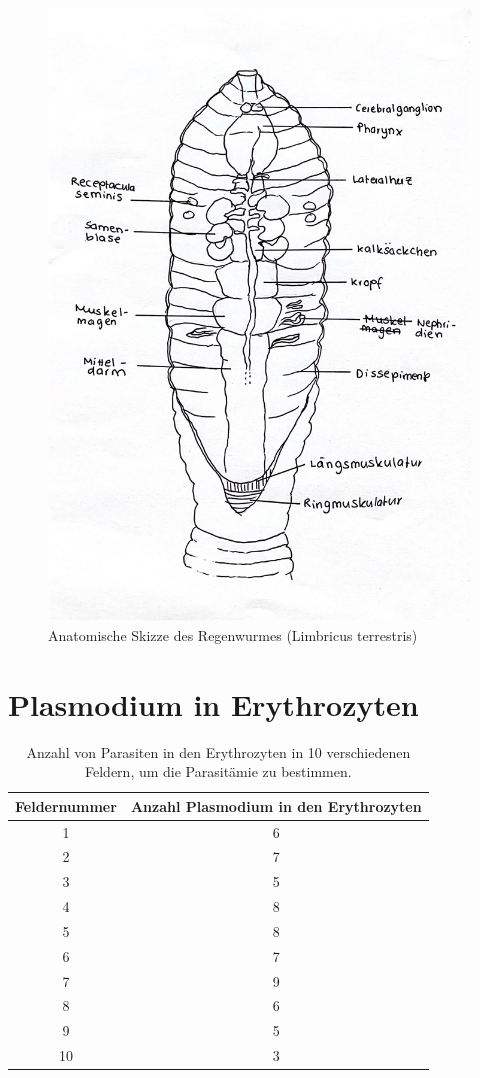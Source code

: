 \documentclass[oneside,10pt,a4paper]{report}
\begin{document}
		\begin{figure}[H]
			\centering
			\includegraphics[scale=0.25]{Regenwurm.JPG}
			\caption{Anatomische Skizze des Regenwurmes (Limbricus terrestris)}
			\label{fig:Regenwurm_ana}
		\end{figure}
		
		\section{Plasmodium in Erythrozyten}
				\begin{table}[H]
				\centering
				\caption{Anzahl von Parasiten in den Erythrozyten in 10 verschiedenen Feldern, um die Parasitämie zu bestimmen.}
				\label{tab: Eryzahl}
				\begin{tabular}{cc}
					\toprule
					Feldernummer & Anzahl Plasmodium in den Erythrozyten\\
					\midrule
					1 & 6 \\
					2 & 7 \\
					3 & 5 \\
					4 & 8 \\
					5 & 8 \\
					6 & 7 \\
					7 & 9 \\
					8 & 6 \\
					9 & 5 \\
					10 & 3 \\
					\bottomrule			
				\end{tabular}
			\end{table}
		
		
		
		
	
	\nocite{*}
	
	\newpage
\end{document}
